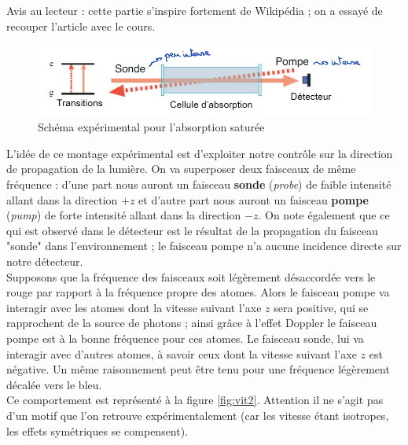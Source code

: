 Avis au lecteur : cette partie s'inspire fortement de Wikipédia ; on a essayé de recouper l'article avec le cours.\\
\begin{figure}[tph]
    \centering
    \includegraphics[width=\textwidth]{Images2/AbsoSatu.PNG}
    \caption{Schéma expérimental pour l'absorption saturée}
\label{fig:absoSatu}
\end{figure}
L'idée de ce montage expérimental est d'exploiter notre contrôle sur la direction de propagation de la lumière. On va superposer deux faisceaux de même fréquence : d'une part nous auront un faisceau \textbf{sonde} (\textit{probe}) de faible intensité allant dans la direction $+z$ et d'autre part nous auront un faisceau \textbf{pompe} (\textit{pump}) de forte intensité allant dans la direction $-z$. On note également que ce qui est observé dans le détecteur est le résultat de la propagation du faisceau "sonde" dans l'environnement ; le faisceau pompe n'a aucune incidence directe sur notre détecteur.\\

Supposons que la fréquence des faisceaux soit légèrement désaccordée vers le rouge par rapport à la fréquence propre des atomes. Alors le faisceau pompe va interagir avec les atomes dont la vitesse suivant l'axe $z$ sera positive, qui se rapprochent de la source de photons ; ainsi grâce à l'effet Doppler le faisceau pompe est à la bonne fréquence pour ces atomes. Le faisceau sonde, lui va interagir avec d'autres atomes, à savoir ceux dont la vitesse suivant l'axe $z$ est négative. Un même raisonnement peut être tenu pour une fréquence légèrement décalée vers le bleu.\\
Ce comportement est représenté à la figure \ref{fig:vit2}. Attention il ne s'agit pas d'un motif que l'on retrouve expérimentalement (car les vitesse étant isotropes, les effets symétriques se compensent).\\

